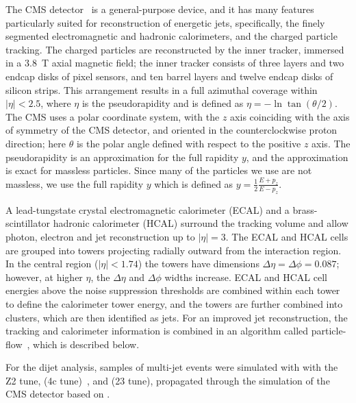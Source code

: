 
\label{sec:cms_detector}


The CMS detector~\cite{:2008zzk}
is a general-purpose device, and it has
many features particularly suited for reconstruction of 
energetic jets, specifically, the finely segmented electromagnetic
and hadronic calorimeters, and the charged particle tracking.
The charged particles are reconstructed by the inner tracker,
immersed in a $3.8$~T axial magnetic field; the inner tracker consists
of three layers and two endcap disks of pixel sensors, and ten
barrel layers and twelve endcap disks of silicon strips.  This
arrangement results
in a full azimuthal coverage within $|\eta| < 2.5$, where $\eta$
is the pseudorapidity and is defined as $\eta = -\ln\tan(\theta/2)$.
The CMS uses a polar coordinate system, with the 
$z$ axis coinciding with the axis of symmetry of the CMS detector,
and oriented in the counterclockwise proton direction; here $\theta$ 
is the polar angle defined with respect to the positive $z$ axis.
The pseudorapidity is an approximation for the full rapidity $y$, and
the approximation is exact for massless particles. Since many of the
particles we use are not massless, we use the full rapidity $y$ which
is defined as $y = \frac{1}{2} \frac {E + p_{z}}{E - p_{z}}$.

A lead-tungstate crystal electromagnetic calorimeter (ECAL) and 
a brass-scintillator hadronic calorimeter (HCAL) surround the tracking
volume and allow photon, electron and jet reconstruction up to $|\eta|=3$.
The ECAL and HCAL cells are grouped into towers projecting radially 
outward from the interaction region.  In the central region ($|\eta|<1.74$)
the towers have dimensions $\Delta\eta = \Delta\phi = 0.087$; however,
at higher $\eta$, the $\Delta\eta$ and $\Delta\phi$ widths increase.  
ECAL and HCAL
cell energies above the noise suppression thresholds are combined within
each tower to define the calorimeter tower energy, and the towers are further
combined into clusters, which are then identified as jets.  For an improved
jet reconstruction, the tracking and calorimeter information is combined 
in an algorithm called particle-flow~\cite{particleflow}, which is described below.

For the dijet analysis, samples of multi-jet events were
simulated with \PYTHIA with the Z2 tune,
\PYTHIAEIGHT (4c tune)~\cite{pythia8}, and \HERWIG (23 tune), propagated through the simulation of the CMS
detector based on  \cite{Geant4}.

